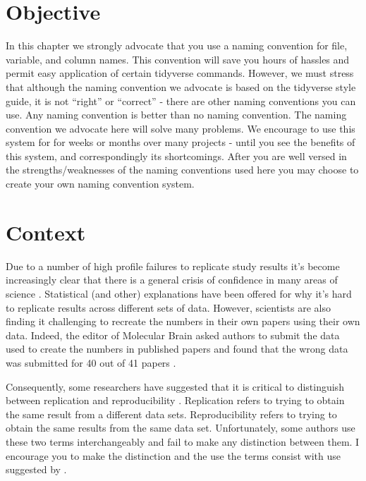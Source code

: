 \documentclass[
]{krantz}
\begin{document}
\hypertarget{objective-1}{%
\section{Objective}\label{objective-1}}

In this chapter we strongly advocate that you use a naming convention for file, variable, and column names. This convention will save you hours of hassles and permit easy application of certain tidyverse commands. However, we must stress that although the naming convention we advocate is based on the tidyverse style guide, it is not ``right'' or ``correct'' - there are other naming conventions you can use. Any naming convention is better than no naming convention. The naming convention we advocate here will solve many problems. We encourage to use this system for for weeks or months over many projects - until you see the benefits of this system, and correspondingly its shortcomings. After you are well versed in the strengths/weaknesses of the naming conventions used here you may choose to create your own naming convention system.

\hypertarget{context}{%
\section{Context}\label{context}}

Due to a number of high profile failures to replicate study results \citep{cos2015} it's become increasingly clear that there is a general crisis of confidence in many areas of science \citep{baker2016}. Statistical (and other) explanations have been offered \citep{simmons2011} for why it's hard to replicate results across different sets of data. However, scientists are also finding it challenging to recreate the numbers in their own papers using their own data. Indeed, the editor of Molecular Brain asked authors to submit the data used to create the numbers in published papers and found that the wrong data was submitted for 40 out of 41 papers \citep{miyakawa2020}.

Consequently, some researchers have suggested that it is critical to distinguish between replication and reproducibility \citep{patil2019}. Replication refers to trying to obtain the same result from a different data sets. Reproducibility refers to trying to obtain the same results from the same data set. Unfortunately, some authors use these two terms interchangeably and fail to make any distinction between them. I encourage you to make the distinction and the use the terms consist with use suggested by \citep{patil2019}.
\end{document}
